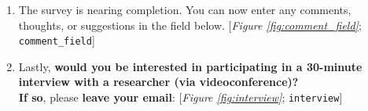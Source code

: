 \begin{enumerate}[resume]
\item  \label{q:comment_field} The survey is nearing completion. You can now enter any comments, thoughts, or suggestions in the field below. [\textit{Figure \ref{fig:comment_field}}; 
\verb|comment_field|]


\item  \label{q:interview} Lastly, \textbf{would you be interested in participating in a 30-minute interview with a researcher (via videoconference)? }\\\textbf{If so}, please \textbf{leave your email}: [\textit{Figure \ref{fig:interview}}; 
\verb|interview|]

 \end{enumerate} 

